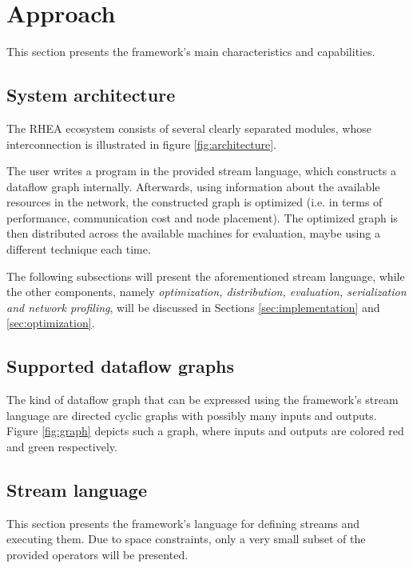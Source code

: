 \documentclass[sigplan,review,anonymous]{acmart}\settopmatter{printfolios=true,printacmref=false}
\begin{document}
\section{Approach} \label{sec:approach}
This section presents the framework's main characteristics and capabilities.

\subsection{System architecture}
The \textsc{RHEA} ecosystem consists of several clearly separated modules, whose interconnection is illustrated in figure \ref{fig:architecture}.


The user writes a program in the provided stream language, which constructs a dataflow graph internally. Afterwards, using information about the available resources in the network, the constructed graph is optimized (i.e. in terms of performance, communication cost and node placement). The optimized graph is then distributed across the available machines for evaluation, maybe using a different technique each time.

The following subsections will present the aforementioned stream language, while the other components, namely \textit{optimization, distribution, evaluation, serialization and network profiling}, will be discussed in Sections \ref{sec:implementation} and \ref{sec:optimization}.

\subsection{Supported dataflow graphs}

The kind of dataflow graph that can be expressed using the framework's stream language are directed cyclic graphs with possibly many inputs and outputs. Figure \ref{fig:graph} depicts such a graph, where inputs and outputs are colored red and green respectively.


\subsection{Stream language}
This section presents the framework's language for defining streams and executing them. Due to space constraints, only a very small subset of the provided operators will be presented.
\end{document}
